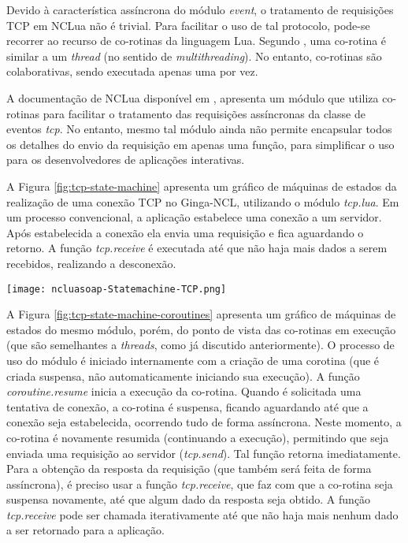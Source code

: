 Devido à característica assíncrona do módulo \textit{event}, o tratamento de requisições TCP em NCLua não é trivial. 
Para facilitar o uso de tal protocolo, pode-se recorrer ao recurso de co-rotinas da linguagem Lua. 
Segundo \cite{ierusalimschy2006programming}, uma co-rotina é similar a um \textit{thread} (no sentido de \textit{multithreading}).
No entanto, co-rotinas são colaborativas, sendo executada apenas uma por vez.

A documentação de NCLua disponível em \cite{doc-nclua}, apresenta um módulo que utiliza co-rotinas para facilitar 
o tratamento das requisições assíncronas da classe de eventos \textit{tcp}. No entanto, mesmo tal módulo ainda não
permite encapsular todos os detalhes do envio da requisição em apenas uma função, para simplificar 
o uso para os desenvolvedores de aplicações interativas.

A Figura \ref{fig:tcp-state-machine} apresenta um gráfico de máquinas de estados
da realização de uma conexão TCP no Ginga-NCL, utilizando o módulo \textit{tcp.lua}.
Em um processo convencional, a aplicação estabelece uma conexão
a um servidor. Após estabelecida a conexão ela envia uma requisição
e fica aguardando o retorno. A função \textit{tcp.receive} é executada até
que não haja mais dados a serem recebidos, realizando
a desconexão.

\begin{center}
	\texttt{[image: ncluasoap-Statemachine-TCP.png]}
	\label{fig:tcp-state-machine}
\end{center}

A Figura \ref{fig:tcp-state-machine-coroutines} apresenta um gráfico de máquinas de estados
do mesmo módulo, porém, do ponto de vista das co-rotinas em execução (que são semelhantes
a \textit{threads}, como já discutido anteriormente). O processo de uso do módulo
é iniciado internamente com a criação de uma corotina (que é criada suspensa,
não automaticamente iniciando sua execução). A função \textit{coroutine.resume}
inicia a execução da co-rotina. Quando é solicitada uma tentativa de
conexão, a co-rotina é suspensa, ficando aguardando até que 
a conexão seja estabelecida, ocorrendo tudo de forma assíncrona.
Neste momento, a co-rotina é novamente resumida (continuando a execução),
permitindo que seja enviada uma requisição ao servidor (\textit{tcp.send}).
Tal função retorna imediatamente. Para a obtenção da resposta
da requisição (que também será feita de forma assíncrona), 
é preciso usar a função \textit{tcp.receive}, que faz com que a co-rotina
seja suspensa novamente, até que algum dado da resposta seja obtido.
A função \textit{tcp.receive} pode ser chamada iterativamente até que
não haja mais nenhum dado a ser retornado para a aplicação.

